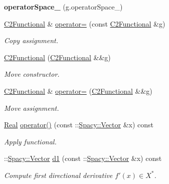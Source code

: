 \begin{DoxyCompactItemize}
\item 
\hypertarget{classSpacy_1_1Kaskade_1_1C2Functional_a96a7f6a98f4f7e20c543792fc9d00626}{{\bfseries operator\-Space\-\_\-} (g.\-operator\-Space\-\_\-)}\label{classSpacy_1_1Kaskade_1_1C2Functional_a96a7f6a98f4f7e20c543792fc9d00626}

\item 
\hyperlink{classSpacy_1_1Kaskade_1_1C2Functional}{\-C2\-Functional} \& \hyperlink{classSpacy_1_1Kaskade_1_1C2Functional_a1e24c0959890ba4caf0531cf47f3bee5}{operator=} (const \hyperlink{classSpacy_1_1Kaskade_1_1C2Functional}{\-C2\-Functional} \&g)
\begin{DoxyCompactList}\small\item\em \-Copy assignment. \end{DoxyCompactList}\item 
\hyperlink{classSpacy_1_1Kaskade_1_1C2Functional_a0e66514d9695478a14c08742a7c28a6a}{\-C2\-Functional} (\hyperlink{classSpacy_1_1Kaskade_1_1C2Functional}{\-C2\-Functional} \&\&g)
\begin{DoxyCompactList}\small\item\em \-Move constructor. \end{DoxyCompactList}\item 
\hyperlink{classSpacy_1_1Kaskade_1_1C2Functional}{\-C2\-Functional} \& \hyperlink{classSpacy_1_1Kaskade_1_1C2Functional_aa0c64075aa455e96672ddf78693818e4}{operator=} (\hyperlink{classSpacy_1_1Kaskade_1_1C2Functional}{\-C2\-Functional} \&\&g)
\begin{DoxyCompactList}\small\item\em \-Move assignment. \end{DoxyCompactList}\item 
\hyperlink{classSpacy_1_1Real}{\-Real} \hyperlink{classSpacy_1_1Kaskade_1_1C2Functional_a74b955be1cc2cb7de4e66b434428fd89}{operator()} (const \-::\hyperlink{classSpacy_1_1Vector}{\-Spacy\-::\-Vector} \&x) const 
\begin{DoxyCompactList}\small\item\em \-Apply functional. \end{DoxyCompactList}\item 
\-::\hyperlink{classSpacy_1_1Vector}{\-Spacy\-::\-Vector} \hyperlink{classSpacy_1_1Kaskade_1_1C2Functional_a69d3260b5313bd495e8f5871b15738db}{d1} (const \-::\hyperlink{classSpacy_1_1Vector}{\-Spacy\-::\-Vector} \&x) const 
\begin{DoxyCompactList}\small\item\em \-Compute first directional derivative $f'(x) \in X^* $. \end{DoxyCompactList}\item 

\end{DoxyCompactItemize}
